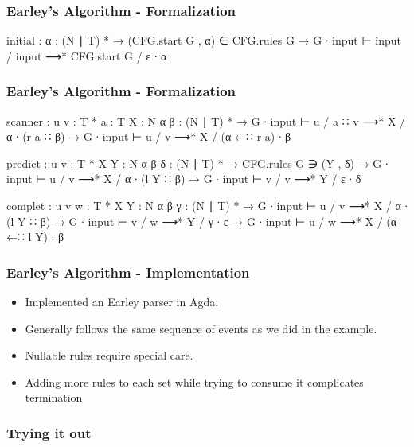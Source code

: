 \begin{frame}
	\frametitle{Earley's Algorithm - Formalization}
	\begin{code}
	  initial : {α : (N ∣ T) *} →
	    (CFG.start G , α) ∈ CFG.rules G →
	    G ∙ input ⊢ input / input ⟶* CFG.start G / ε ∙ α
	\end{code}
\end{frame}

\begin{frame}
	\frametitle{Earley's Algorithm - Formalization}
	\begin{code}
	  scanner : {u v : T *} {a : T} {X : N} {α β : (N ∣ T) *} →
	    G ∙ input ⊢ u / a ∷ v ⟶* X / α ∙ (r a ∷ β) →
	    G ∙ input ⊢ u / v ⟶* X / (α ←∷ r a) ∙ β

	  predict : {u v : T *} {X Y : N} {α β δ : (N ∣ T) *} →
	    CFG.rules G ∋ (Y , δ) →
	    G ∙ input ⊢ u / v ⟶* X / α ∙ (l Y ∷ β) →
	    G ∙ input ⊢ v / v ⟶* Y / ε ∙ δ

	  complet : {u v w : T *} {X Y : N} {α β γ : (N ∣ T) *} →
	    G ∙ input ⊢ u / v ⟶* X / α ∙ (l Y ∷ β) →
	    G ∙ input ⊢ v / w ⟶* Y / γ ∙ ε →
	    G ∙ input ⊢ u / w ⟶* X / (α ←∷ l Y) ∙ β
	\end{code}
\end{frame}

\begin{frame}
	\frametitle{Earley's Algorithm - Implementation}
	\begin{itemize}
		\item Implemented an Earley parser in Agda.
		\item Generally follows the same sequence of events as we did in the 
			example.
		\item Nullable rules require special care.
		\item Adding more rules to each set while trying to consume it 
			complicates termination
	\end{itemize}
\end{frame}

\begin{frame}
	\frametitle{Trying it out}
\end{frame}


